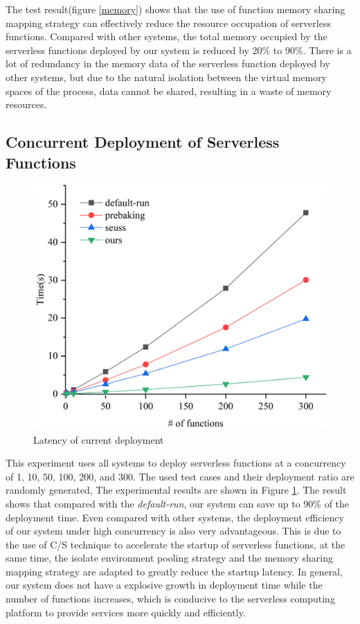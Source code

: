 The test result(figure \ref{memory}) shows that the use of function memory 
sharing mapping strategy can effectively reduce the resource 
occupation of serverless functions. 
Compared with other systems, 
the total memory occupied by the serverless functions 
deployed by our system is reduced by 20\% to 90\%. 
There is a lot of redundancy in the memory data of the serverless function deployed by other systems, 
but due to the natural isolation between the virtual memory spaces of the process, data cannot be shared, 
resulting in a waste of memory resources.

\subsection{Concurrent Deployment of Serverless Functions}

\begin{figure}[t]
    \centering
    \includegraphics[width=\linewidth]{images/concurrent.png}
    \caption{Latency of current deployment}
    \label{concurrent}
\end{figure}

This experiment uses all systems to deploy serverless functions at a concurrency of 1, 10, 50, 100, 200, and 300. 
The used test cases and their deployment ratio are randomly generated, 
The experimental results are shown in Figure \ref{concurrent}. 
The result shows that compared with the \textit{default-run}, 
our system can save up to 90\% of the deployment time. 
Even compared with other systems, 
the deployment efficiency of our system under high concurrency is also very advantageous. 
This is due to the use of C/S technique to accelerate the startup of serverless functions, at the same time, 
the isolate environment pooling strategy 
and the memory sharing mapping strategy
are adapted to greatly reduce the startup latency. 
In general, 
our system does not have a explosive growth in deployment 
time while the number of functions increases, 
which is conducive to the serverless computing platform to provide services more quickly and efficiently.
